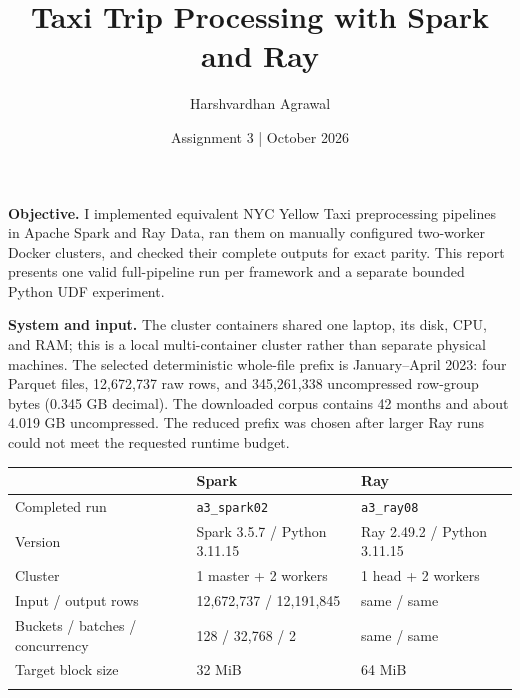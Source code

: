 \documentclass[10pt]{article}
\title{Taxi Trip Processing with Spark and Ray}
\author{Harshvardhan Agrawal}
\date{Assignment 3 \quad | \quad 5 October 2026}
\begin{document}
\maketitle
\vspace{-1.1em}
\textbf{Objective.} I implemented equivalent NYC Yellow Taxi preprocessing pipelines in Apache Spark and Ray Data, ran them on manually configured two-worker Docker clusters, and checked their complete outputs for exact parity. This report presents one valid full-pipeline run per framework and a separate bounded Python UDF experiment.

\textbf{System and input.} The cluster containers shared one laptop, its disk, CPU, and RAM; this is a local multi-container cluster rather than separate physical machines. The selected deterministic whole-file prefix is January--April 2023: four Parquet files, 12,672,737 raw rows, and 345,261,338 uncompressed row-group bytes (0.345 GB decimal). The downloaded corpus contains 42 months and about 4.019 GB uncompressed. The reduced prefix was chosen after larger Ray runs could not meet the requested runtime budget.

\begin{center}
\small
\begin{tabular}{@{}lll@{}}
\hline
 & \textbf{Spark} & \textbf{Ray}\\
\hline
Completed run & \texttt{a3\_spark02} & \texttt{a3\_ray08}\\
Version & Spark 3.5.7 / Python 3.11.15 & Ray 2.49.2 / Python 3.11.15\\
Cluster & 1 master + 2 workers & 1 head + 2 workers\\
Input / output rows & 12,672,737 / 12,191,845 & same / same\\
Buckets / batches / concurrency & 128 / 32,768 / 2 & same / same\\
Target block size & 32 MiB & 64 MiB\\
\\\hline
\end{tabular}
\end{center}
\end{document}
